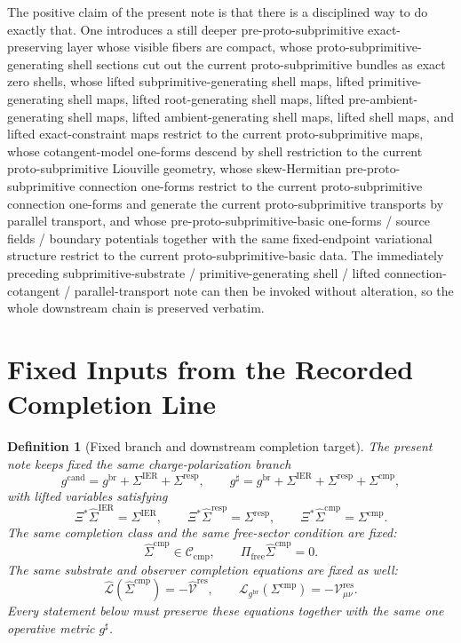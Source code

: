 \documentclass[11pt]{article}
\newcommand{\ObserverMap}{\Xi}
\newcommand{\ObserverMetric}{g^{\mathrm{br}}}
\newcommand{\CandidateMetric}{g^{\mathrm{cand}}}
\newcommand{\CompletedMetric}{g^{\sharp}}
\newcommand{\BaseShift}{\Sigma^{\mathrm{IER}}}
\newcommand{\ResponseShift}{\Sigma^{\mathrm{resp}}}
\newcommand{\CompShift}{\Sigma^{\mathrm{cmp}}}
\newcommand{\BaseLift}{\widehat\Sigma^{\mathrm{IER}}}
\newcommand{\ResponseLift}{\widehat\Sigma^{\mathrm{resp}}}
\newcommand{\CompLift}{\widehat\Sigma^{\mathrm{cmp}}}
\newcommand{\ResidualCore}{\mathcal V_{\mu\nu}^{\mathrm{res}}}
\newcommand{\ResidualLift}{\widehat{\mathcal V}^{\mathrm{res}}}
\newcommand{\SubReducedEin}{\widehat{\mathcal L}}
\newcommand{\FreeProj}{\Pi_{\mathrm{free}}}
\newcommand{\ReducedEin}{\mathcal L_{\ObserverMetric}}
\newcommand{\CompClass}{\mathscr C_{\mathrm{cmp}}}
\newtheorem{definition}{Definition}
\begin{document}
The positive claim of the present note is that there is a disciplined way to do exactly that. One introduces a still deeper pre-proto-subprimitive exact-preserving layer whose visible fibers are compact, whose proto-subprimitive-generating shell sections cut out the current proto-subprimitive bundles as exact zero shells, whose lifted subprimitive-generating shell maps, lifted primitive-generating shell maps, lifted root-generating shell maps, lifted pre-ambient-generating shell maps, lifted ambient-generating shell maps, lifted shell maps, and lifted exact-constraint maps restrict to the current proto-subprimitive maps, whose cotangent-model one-forms descend by shell restriction to the current proto-subprimitive Liouville geometry, whose skew-Hermitian pre-proto-subprimitive connection one-forms restrict to the current proto-subprimitive connection one-forms and generate the current proto-subprimitive transports by parallel transport, and whose pre-proto-subprimitive-basic one-forms / source fields / boundary potentials together with the same fixed-endpoint variational structure restrict to the current proto-subprimitive-basic data. The immediately preceding subprimitive-substrate / primitive-generating shell / lifted connection-cotangent / parallel-transport note can then be invoked without alteration, so the whole downstream chain is preserved verbatim.

\section{Fixed Inputs from the Recorded Completion Line}

\begin{definition}[Fixed branch and downstream completion target]
\label{def:fixed_branch}
The present note keeps fixed the same charge-polarization branch
\begin{equation}
\CandidateMetric
=
\ObserverMetric+\BaseShift+\ResponseShift,
\qquad
\CompletedMetric
=
\ObserverMetric+\BaseShift+\ResponseShift+\CompShift,
\label{eq:fixed_metrics}
\end{equation}
with lifted variables satisfying
\begin{equation}
\ObserverMap^*\BaseLift=\BaseShift,
\qquad
\ObserverMap^*\ResponseLift=\ResponseShift,
\qquad
\ObserverMap^*\CompLift=\CompShift.
\label{eq:fixed_lifts}
\end{equation}
The same completion class and the same free-sector condition are fixed:
\begin{equation}
\CompLift\in\CompClass,
\qquad
\FreeProj\CompLift=0.
\label{eq:fixed_free}
\end{equation}
The same substrate and observer completion equations are fixed as well:
\begin{equation}
\SubReducedEin(\CompLift)=-\ResidualLift,
\qquad
\ReducedEin(\CompShift)=-\ResidualCore.
\label{eq:fixed_solves}
\end{equation}
Every statement below must preserve these equations together with the same one operative metric \(\CompletedMetric\).
\end{definition}
\end{document}

